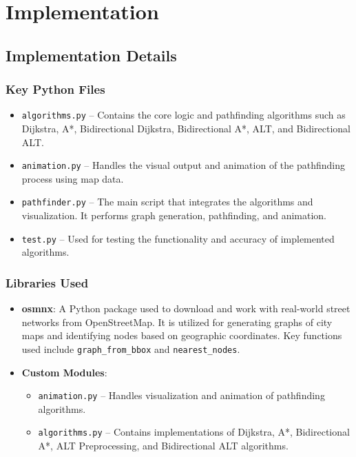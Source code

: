 \chapter{Implementation}

\section{Implementation Details}

\subsection{Key Python Files}
\begin{itemize}
	\item \texttt{algorithms.py} – Contains the core logic and pathfinding algorithms such as Dijkstra, A*, Bidirectional Dijkstra, Bidirectional A*, ALT, and Bidirectional ALT.
	\item \texttt{animation.py} – Handles the visual output and animation of the pathfinding process using map data.
	\item \texttt{pathfinder.py} – The main script that integrates the algorithms and visualization. It performs graph generation, pathfinding, and animation.
	\item \texttt{test.py} – Used for testing the functionality and accuracy of implemented algorithms.
\end{itemize}

\subsection{Libraries Used}
\begin{itemize}
	\item \textbf{osmnx}: A Python package used to download and work with real-world street networks from OpenStreetMap. It is utilized for generating graphs of city maps and identifying nodes based on geographic coordinates. Key functions used include \texttt{graph\_from\_bbox} and \texttt{nearest\_nodes}.
	
	\item \textbf{Custom Modules}:
	\begin{itemize}
		\item \texttt{animation.py} – Handles visualization and animation of pathfinding algorithms.
		\item \texttt{algorithms.py} – Contains implementations of Dijkstra, A*, Bidirectional A*, ALT Preprocessing, and Bidirectional ALT algorithms.
	\end{itemize}
\end{itemize}

